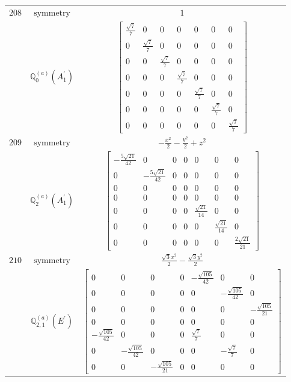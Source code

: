 \documentclass[fleqn,8pt,landscape]{jsarticle}
\begin{document}
\begin{longtable}{ccc}
$ 208 $ & $ \text{symmetry} $ & $ 1 $ \\
$  $ & $ \mathbb{Q}_{0}^{(a)}(A_{1}^{\prime}) $ & $ \begin{bmatrix} \frac{\sqrt{7}}{7} & 0 & 0 & 0 & 0 & 0 & 0 \\ 0 & \frac{\sqrt{7}}{7} & 0 & 0 & 0 & 0 & 0 \\ 0 & 0 & \frac{\sqrt{7}}{7} & 0 & 0 & 0 & 0 \\ 0 & 0 & 0 & \frac{\sqrt{7}}{7} & 0 & 0 & 0 \\ 0 & 0 & 0 & 0 & \frac{\sqrt{7}}{7} & 0 & 0 \\ 0 & 0 & 0 & 0 & 0 & \frac{\sqrt{7}}{7} & 0 \\ 0 & 0 & 0 & 0 & 0 & 0 & \frac{\sqrt{7}}{7} \end{bmatrix} $ \\ \hline
$ 209 $ & $ \text{symmetry} $ & $ - \frac{x^{2}}{2} - \frac{y^{2}}{2} + z^{2} $ \\
$  $ & $ \mathbb{Q}_{2}^{(a)}(A_{1}^{\prime}) $ & $ \begin{bmatrix} - \frac{5 \sqrt{21}}{42} & 0 & 0 & 0 & 0 & 0 & 0 \\ 0 & - \frac{5 \sqrt{21}}{42} & 0 & 0 & 0 & 0 & 0 \\ 0 & 0 & 0 & 0 & 0 & 0 & 0 \\ 0 & 0 & 0 & 0 & 0 & 0 & 0 \\ 0 & 0 & 0 & 0 & \frac{\sqrt{21}}{14} & 0 & 0 \\ 0 & 0 & 0 & 0 & 0 & \frac{\sqrt{21}}{14} & 0 \\ 0 & 0 & 0 & 0 & 0 & 0 & \frac{2 \sqrt{21}}{21} \end{bmatrix} $ \\ \hline
$ 210 $ & $ \text{symmetry} $ & $ \frac{\sqrt{3} x^{2}}{2} - \frac{\sqrt{3} y^{2}}{2} $ \\
$  $ & $ \mathbb{Q}_{2,1}^{(a)}(E^{\prime}) $ & $ \begin{bmatrix} 0 & 0 & 0 & 0 & - \frac{\sqrt{105}}{42} & 0 & 0 \\ 0 & 0 & 0 & 0 & 0 & - \frac{\sqrt{105}}{42} & 0 \\ 0 & 0 & 0 & 0 & 0 & 0 & - \frac{\sqrt{105}}{21} \\ 0 & 0 & 0 & 0 & 0 & 0 & 0 \\ - \frac{\sqrt{105}}{42} & 0 & 0 & 0 & \frac{\sqrt{7}}{7} & 0 & 0 \\ 0 & - \frac{\sqrt{105}}{42} & 0 & 0 & 0 & - \frac{\sqrt{7}}{7} & 0 \\ 0 & 0 & - \frac{\sqrt{105}}{21} & 0 & 0 & 0 & 0 \end{bmatrix} $ \\ \hline

\end{longtable}
\end{document}
